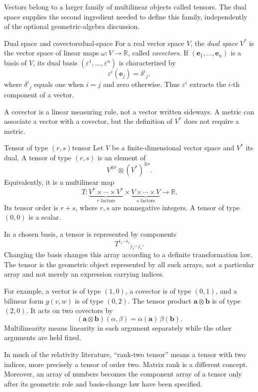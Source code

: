 \documentclass[11pt,a4paper]{article}
\newcommand{\vect}[1]{\bm{#1}}
\newcommand{\R}{\mathbb{R}}
\begin{document}
Vectors belong to a larger family of multilinear objects called tensors.
The dual space supplies the second ingredient needed to define this family,
independently of the optional geometric-algebra discussion.

\begin{definition}{Dual space and covectors}{dual-space}
For a real vector space \(V\), the \emph{dual space} \(V^*\) is the vector
space of linear maps \(\omega:V\to\R\), called \emph{covectors}. If
\((\vect e_1,\ldots,\vect e_n)\) is a basis of \(V\), its dual basis
\((\varepsilon^1,\ldots,\varepsilon^n)\) is characterized by
\[
  \varepsilon^i(\vect e_j)=\delta^i{}_j,
\]
where \(\delta^i{}_j\) equals one when \(i=j\) and zero otherwise. Thus
\(\varepsilon^i\) extracts the \(i\)-th component of a vector.
\end{definition}

A covector is a linear measuring rule, not a vector written sideways. A
metric can associate a vector with a covector, but the definition of \(V^*\)
does not require a metric.

\begin{definition}{Tensor of type \((r,s)\)}{tensor}
Let \(V\) be a finite-dimensional vector space and \(V^*\) its dual. A tensor
of type \((r,s)\) is an element of
\[
  V^{\otimes r}\otimes(V^*)^{\otimes s}.
\]
Equivalently, it is a multilinear map
\[
  T:\underbrace{V^*\times\cdots\times V^*}_{r\text{ factors}}
  \times
  \underbrace{V\times\cdots\times V}_{s\text{ factors}}
  \longrightarrow\R.
\]
Its tensor order is \(r+s\), where \(r,s\) are nonnegative integers. A tensor
of type \((0,0)\) is a scalar.
\end{definition}

In a chosen basis, a tensor is represented by components
\[
  T^{i_1\cdots i_r}{}_{j_1\cdots j_s}.
\]
Changing the basis changes this array according to a definite transformation
law. The tensor is the geometric object represented by all such arrays, not a
particular array and not merely an expression carrying indices.

For example, a vector is of type \((1,0)\), a covector is of type \((0,1)\),
and a bilinear form \(g(v,w)\) is of type \((0,2)\). The tensor product
\(\vect a\otimes\vect b\) is of type \((2,0)\). It acts on two covectors by
\[
  (\vect a\otimes\vect b)(\alpha,\beta)
  =\alpha(\vect a)\,\beta(\vect b).
\]
Multilinearity means linearity in each argument separately while the other
arguments are held fixed.

\begin{precision}
In much of the relativity literature, ``rank-two tensor'' means a tensor with
two indices, more precisely a tensor of order two. Matrix rank is a different
concept. Moreover, an array of numbers becomes the component array of a tensor
only after its geometric role and basis-change law have been specified.
\end{precision}
\end{document}
